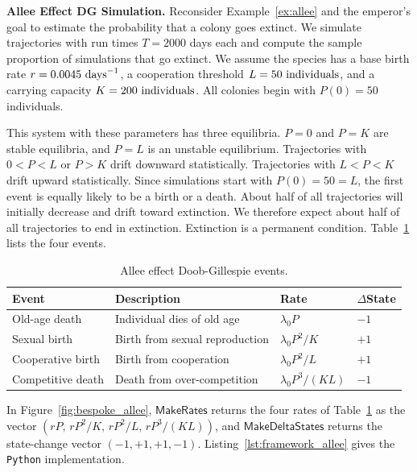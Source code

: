 \begin{example}\label{ex:allee_code}
\textbf{Allee Effect DG Simulation.}
Reconsider Example~\ref{ex:allee} and the emperor's goal to estimate the probability that a colony goes extinct. We simulate trajectories with run times $T=2000$ days each and compute the sample proportion of simulations that go extinct. We assume the species has a base birth rate $r = 0.0045\textup{ days}^{-1}$, a cooperation threshold $L = 50\textup{ individuals}$, and a carrying capacity $K = 200\textup{ individuals}$. All colonies begin with $P(0) = 50$ individuals.

This system with these parameters has three equilibria. $P = 0$ and $P = K$ are stable equilibria, and $P = L$ is an unstable equilibrium. Trajectories with $0 < P < L$ or $P > K$ drift downward statistically. Trajectories with $L < P < K$ drift upward statistically. Since simulations start with $P(0) = 50 = L$, the first event is equally likely to be a birth or a death. About half of all trajectories will initially decrease and drift toward extinction. We therefore expect about half of all trajectories to end in extinction. Extinction is a permanent condition. Table~\ref{tab:allee_events} lists the four events.

\begin{table}[htbp]
\centering
\caption{Allee effect Doob-Gillespie events.}\label{tab:allee_events}
\begin{tabular}{llll}
\hline
Event & Description & Rate & $\Delta$State \\
\hline
Old-age death & Individual dies of old age & $\lambda_0 P$ & $-1$ \\
Sexual birth & Birth from sexual reproduction & $\lambda_0 P^2/K$ & $+1$ \\
Cooperative birth & Birth from cooperation & $\lambda_0 P^2/L$ & $+1$ \\
Competitive death & Death from over-competition & $\lambda_0 P^3/(KL)$ & $-1$ \\
\hline
\end{tabular}
\end{table}

In Figure~\ref{fig:bespoke_allee}, $\textsf{MakeRates}$ returns the four rates of Table~\ref{tab:allee_events} as the vector $(rP,\, rP^2/K,\, rP^2/L,\, rP^3/(KL))$, and $\textsf{MakeDeltaStates}$ returns the state-change vector $(-1, +1, +1, -1)$. Listing~\ref{lst:framework_allee} gives the \texttt{Python} implementation.


\end{example}
